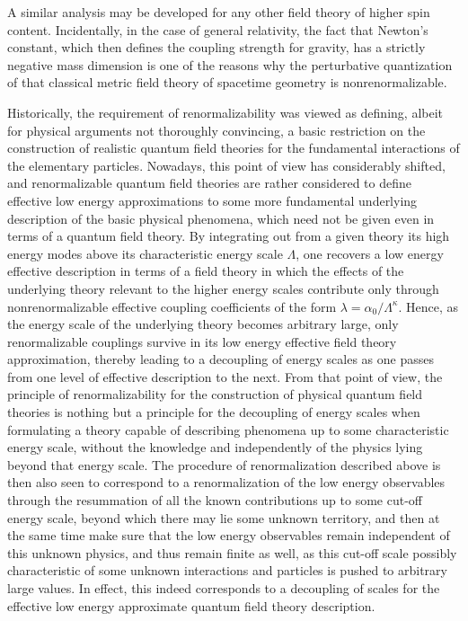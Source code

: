 \documentclass[a4paper,11pt]{article}
\begin{document}
A similar analysis may be developed for any other field theory
of higher spin content. Incidentally, in the case of general relativity,
the fact that Newton's constant, which then defines the coupling strength for
gravity, has a strictly negative mass dimension is one of the reasons why
the perturbative quantization of that classical metric field theory of
spacetime geometry is nonrenormalizable.

Historically, the requirement of renormalizability was viewed as de\-fi\-ning,
albeit for physical arguments not thoroughly convincing, a basic restriction 
on the construction of realistic quantum field theories for the fundamental
interactions of the elementary particles. Nowadays, this point of view
has considerably shifted, and renormalizable quantum field theories are
rather considered to define effective low energy approximations to some
more fundamental underlying description of the basic physical phenomena,
which need not be given even in terms of a quantum field theory.\cite{Wein1} 
By integrating
out from a given theory its high energy modes above its characteristic energy
scale $\Lambda$, one recovers a low energy effective description in terms of 
a field theory in which the effects of the underlying theory relevant to the 
higher energy scales contribute only through nonrenormalizable effective 
coupling coefficients of the form $\lambda=\alpha_0/\Lambda^\kappa$. 
Hence, as the energy scale of the underlying theory becomes arbitrary
large, only renormalizable couplings survive in its low energy effective
field theory approximation, thereby leading to a decoupling of energy scales
as one passes from one level of effective description to the next.
From that point of view, the principle of renormalizability for the
construction of physical quantum field theories is nothing but a principle
for the decoupling of energy scales when formulating a theory capable of
describing phenomena up to some characteristic energy scale, without the
knowledge and independently of the physics lying beyond that energy scale.
The procedure of renormalization described above is then also seen to 
correspond to a renormalization of the low energy observables through the
resummation of all the known contributions up to some cut-off energy scale, 
beyond which there may lie some unknown territory, and then at the same time
make sure that the low energy observables remain independent of this unknown 
physics, and thus remain finite as well, as this cut-off scale possibly 
characteristic of some unknown interactions and particles is pushed to 
arbitrary large values. In effect, this indeed corresponds to a decoupling 
of scales for the effective low energy approximate quantum field theory 
description.
\end{document}
